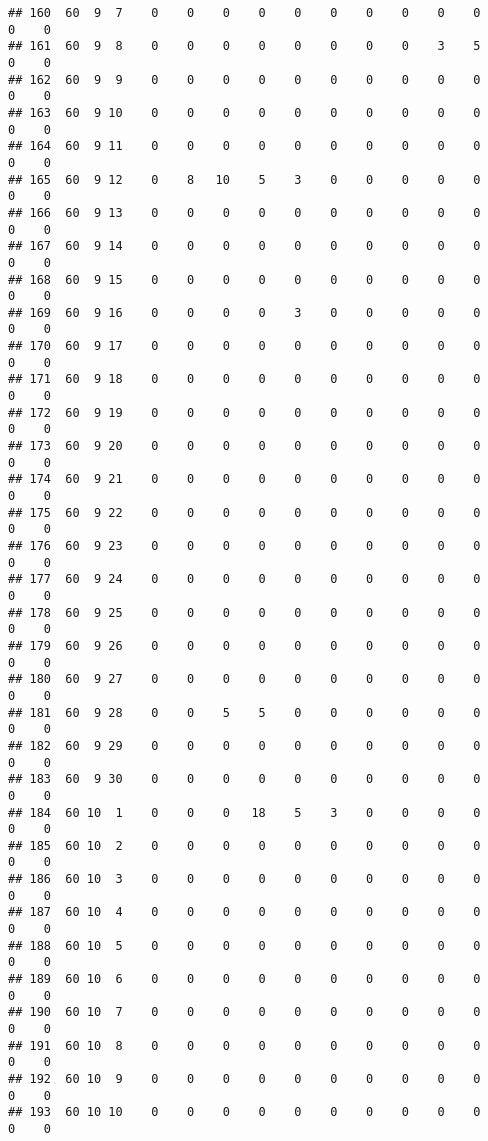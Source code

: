 \documentclass[]{article}
\begin{document}
\begin{verbatim}
## 160  60  9  7    0    0    0    0    0    0    0    0    0    0    0    0
## 161  60  9  8    0    0    0    0    0    0    0    0    3    5    0    0
## 162  60  9  9    0    0    0    0    0    0    0    0    0    0    0    0
## 163  60  9 10    0    0    0    0    0    0    0    0    0    0    0    0
## 164  60  9 11    0    0    0    0    0    0    0    0    0    0    0    0
## 165  60  9 12    0    8   10    5    3    0    0    0    0    0    0    0
## 166  60  9 13    0    0    0    0    0    0    0    0    0    0    0    0
## 167  60  9 14    0    0    0    0    0    0    0    0    0    0    0    0
## 168  60  9 15    0    0    0    0    0    0    0    0    0    0    0    0
## 169  60  9 16    0    0    0    0    3    0    0    0    0    0    0    0
## 170  60  9 17    0    0    0    0    0    0    0    0    0    0    0    0
## 171  60  9 18    0    0    0    0    0    0    0    0    0    0    0    0
## 172  60  9 19    0    0    0    0    0    0    0    0    0    0    0    0
## 173  60  9 20    0    0    0    0    0    0    0    0    0    0    0    0
## 174  60  9 21    0    0    0    0    0    0    0    0    0    0    0    0
## 175  60  9 22    0    0    0    0    0    0    0    0    0    0    0    0
## 176  60  9 23    0    0    0    0    0    0    0    0    0    0    0    0
## 177  60  9 24    0    0    0    0    0    0    0    0    0    0    0    0
## 178  60  9 25    0    0    0    0    0    0    0    0    0    0    0    0
## 179  60  9 26    0    0    0    0    0    0    0    0    0    0    0    0
## 180  60  9 27    0    0    0    0    0    0    0    0    0    0    0    0
## 181  60  9 28    0    0    5    5    0    0    0    0    0    0    0    0
## 182  60  9 29    0    0    0    0    0    0    0    0    0    0    0    0
## 183  60  9 30    0    0    0    0    0    0    0    0    0    0    0    0
## 184  60 10  1    0    0    0   18    5    3    0    0    0    0    0    0
## 185  60 10  2    0    0    0    0    0    0    0    0    0    0    0    0
## 186  60 10  3    0    0    0    0    0    0    0    0    0    0    0    0
## 187  60 10  4    0    0    0    0    0    0    0    0    0    0    0    0
## 188  60 10  5    0    0    0    0    0    0    0    0    0    0    0    0
## 189  60 10  6    0    0    0    0    0    0    0    0    0    0    0    0
## 190  60 10  7    0    0    0    0    0    0    0    0    0    0    0    0
## 191  60 10  8    0    0    0    0    0    0    0    0    0    0    0    0
## 192  60 10  9    0    0    0    0    0    0    0    0    0    0    0    0
## 193  60 10 10    0    0    0    0    0    0    0    0    0    0    0    0

\end{verbatim}
\end{document}

